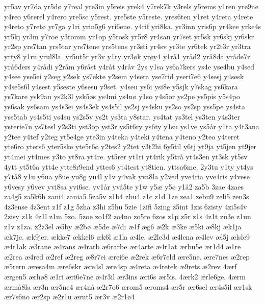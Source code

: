 yr5av
yr7da
yr5d^^f8
y7real
yre3in
y5reis
yrek4
y7rek7k
y3rels
y5rems
y1ren
yre9ne
y4reo
y6rerel
y4rero
yre5sc
y5rest.
yre5ste
y5reste.
yres6ten
y1ret
y4reta
y4rete
y4reto
y7ret^^f8
yr7ga
y1ri
yrin5g6
yri6ene.
y4rif
yri8ka.
yr3inn
yris6p
yr4kee
yrke4s
yr5kj
yr3m
y7roe
y3romm
yr1op
y5rosk
yr5r8
yr4san
yr7set
yr5sk
yr6skj
yr6skr
yr2sp
yrs7tan
yrs5tar
yrs7tene
yrs5tens
yr3sti
yr4sv
yr3te
yr6tek
yr2t3r
yr3tra
yrty8
y1ru
yrul8la.
yr5ut5r
yr3v
y1ry
yr3^^f8k
yr^^f8y4
y1r^^e51
yr^^e5d2
yr^^e58da
yr^^e5de7r
yr^^e56ders
y4r^^e5di
y2r^^e5m
y6r^^e5st
y4r^^e5t
y4r^^e5v
2ys
y1sa
ys6a7kers
ys4e
yse4bu
y4sed
y4see
yse5ei
y2seg
y2sek
ys7ekte
y2sem
y4sera
yse7rid
yseri7e6
y4sesj
y4sesk
y4se5s6l
y4sest
y5seste
y6sesu
y9set.
y4seu
ys6i
ysi8e
y5sjk
y7skag
ys6kara
ys7kare
ysk9au
ys2k3l
ysk5^^f8s
ys4mi
ys4n^^f8
y1so
y4s5or
ys2pe
ys5pis
y5s4po
ys6sak
ys6sam
ys4s3ei
ys4s3ek
ys4s5il
ys2sj
ys4sku
ys2so
ys2sp
yss5pe
ys4sta
yss5tab
ys4s5ti
ys4su
ys2s5v
ys2t
ys3ta
y8star.
ys4tat
ys3tel
ys3ten
y4s3ter
ysterie7n
ys7tesl
y2s3ti
yst3op
yst3r
ys5t6ry
ys6ty
y1su
ys1ve
ys5^^e5r
y1ta
y4t3ana
y2tee
y4tef
y2teg
yt5e4ge
yte3in
y4teka
y4teki
y4tena
y4teno
y2teo
y4teret
yte6ro
yters6
yter5ske
yte5r6^^f8
y2tes2
y2tet
y3t2hi
6y5til
y6tj
yt9ja
yt5jen
yt9jer
yt4mei
yt4mes
y3to
yt8ra
yt4re.
yt5rer
yt1ri
yt4rik
y5tr^^e5
yt4s3en
yt3sk
yt5sv
4ytt
yt5t6a
ytt4e
ytte8r9end
yttes6
yt4test
yt8tien.
yttsa6me.
2y3tu
y1ty
yt4ys
y7t^^e58
y1u
y6ua
y8ue
yu8g
yu4l
y1v
y4vak
yva8la
y2ved
yve4ria
yve4ris
y4vese
y6vesy
y6vev
yvi8sa
yvi6se.
yv1^^e5r
yv^^e55te
y1w
y5^^e6
y5^^f8
y1^^e52
za5b
3zae
4zaes
za4g5
za5k6h
zani4
zania5
5za5v
z1b4
zbu4
z1c
z1d
1ze
zea1
zebu9
zeli5
zen3s
4z3ense
4z3ent
z1f
z1g
5zha
z3hi
z5hu
5zie
1zifi
5zing
z5int
1zis
6zisty
4zi5s4v
2zisy
z1k
4z1l
z1m
5zo.
5zoe
zo1f2
zo4no
zo5re
6zos
z1p
z5r
z1s
4z1t
zu3e
z1un
z1v
z1za.
z2z3el
^^e65by
^^e62b^^f8
^^e65de
^^e67di
^^e61f
^^e6g6
^^e62k
^^e63ke
^^e65ki
^^e68kj
^^e6k1ja
^^e6k7je.
^^e6k9jer.
^^e6kke7
^^e6kkel6
^^e6k6l
^^e61la
^^e64le.
^^e62le3d
^^e64lena
^^e64lev
^^e6l5j
^^e6lsle9
^^e64r1ak
^^e63rane
^^e64rans
^^e64rarb
^^e66rarbe
^^e6r4arte
^^e64r1at
^^e6rbu5e
^^e6r1d4
^^e61re
^^e62rea
^^e64red
^^e62ref
^^e62reg
^^e68r7ei
^^e6rei6e
^^e62rek
^^e66r7eld
^^e6re5ne.
^^e6re7nes
^^e62rep
^^e65rern
^^e6resa4m
^^e6re6skr
^^e6re4sl
^^e6re4sp
^^e64reta
^^e64retek
^^e69rets
^^e62rev
4^^e6rf
^^e6rgen5
^^e6rh^^f88
^^e61ri
^^e6ri6e7ne
^^e64r3il
^^e6r3ins
^^e6ri6s
^^e6r5is.
4^^e6rk2
^^e6rle6ge.
4^^e6rm
^^e6rm^^e58la
^^e6r3n
^^e6r5ne4
^^e6r4n^^e5
^^e62r7o6
^^e6rom5
^^e6roms4
^^e6r5r
^^e6r6sel
^^e6r4s5il
^^e6r1sk
^^e6r7s6no
^^e6r2sp
^^e62r1u
^^e6rut5
^^e6r3v
^^e62r1^^f84
